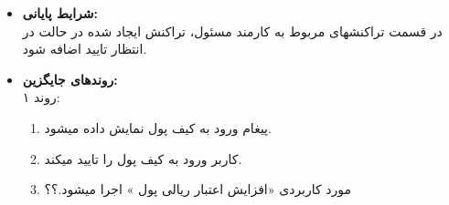 \documentclass{article}
\begin{document}
\begin{itemize}
\item \textbf{شرایط پایانی:}\\ 
در قسمت تراکنشهای مربوط به کارمند مسئول، تراکنش ایجاد شده در حالت در انتظار تایید اضافه شود.
\item \textbf{روندهای جایگزین:}\\
روند ۱:\\
\begin{enumerate}
\item پیغام ورود به کیف پول نمایش داده میشود.
\item کاربر ورود به کیف پول را تایید میکند.
\item مورد کاربردی «افزایش اعتبار ریالی پول » اجرا میشود.؟؟
\end{enumerate}

\end{itemize}


\noindent\makebox[\linewidth]{\rule{\paperwidth}{0.4pt}}
\end{document}

